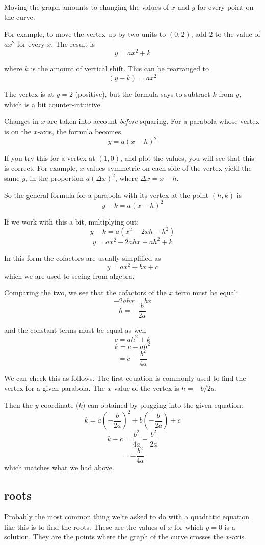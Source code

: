 \documentclass[11pt, oneside]{article}
\begin{document}
Moving the graph amounts to changing the values of $x$ and $y$ for every point on the curve.

For example, to move the vertex up by two units to $(0,2)$, add $2$ to the value of $ax^2$ for every $x$.  The result is
\[ y = ax^2 + k \]

where $k$ is the amount of vertical shift.  This can be rearranged to 
\[ (y - k) = ax^2 \]

The vertex is at $y = 2$ (positive), but the formula says to subtract $k$ from $y$, which is a bit counter-intuitive.

Changes in $x$ are taken into account \emph{before} squaring.  For a parabola whose vertex is on the $x$-axis, the formula becomes
\[ y = a(x-h)^2 \]

If you try this for a vertex at $(1,0)$, and plot the values, you will see that this is correct.  For example, $x$ values symmetric on each side of the vertex yield the same $y$, in the proportion $a(\Delta x)^2$, where $\Delta x = x - h$.

So the general formula for a parabola with its vertex at the point $(h,k)$ is
\[ y - k = a(x - h)^2 \]

If we work with this a bit, multiplying out:
\[ y - k = a(x^2 - 2xh + h^2) \]
\[ y = ax^2 - 2ah x + ah^2 + k \]

In this form the cofactors are usually simplified as
\[ y = ax^2 + bx + c \]
which we are used to seeing from algebra.

Comparing the two, we see that the cofactors of the $x$ term must be equal:
\[ -2ahx = bx \]
\[ h = -\frac{b}{2a} \]

and the constant terms must be equal as well
\[ c = ah^2 + k \] 
\[ k = c - ah^2 \]
\[ = c - \frac{b^2}{4a} \]

We can check this as follows.  The first equation is commonly used to find the vertex for a given parabola.  The $x$-value of the vertex is $h = -b/2a$.

Then the $y$-coordinate ($k$) can obtained by plugging into the given equation:
\[ k = a(-\frac{b}{2a})^2 + b(-\frac{b}{2a}) + c \]
\[ k - c = \frac{b^2}{4a} - \frac{b^2}{2a} \]
\[ = - \frac{b^2}{4a}  \]
which matches what we had above.

\subsection*{roots}

Probably the most common thing we're asked to do with a quadratic equation like this is to find the roots.  These are the values of $x$ for which $y=0$ is a solution.  They are the points where the graph of the curve crosses the $x$-axis.
\end{document}
